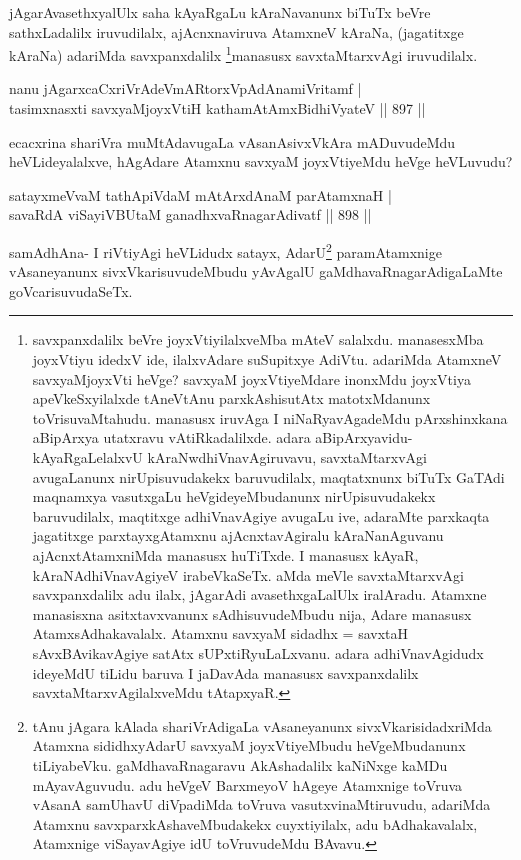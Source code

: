 \begin{artha}
jAgarAvasethxyalUlx saha kAyaRgaLu kAraNavanunx biTuTx beVre sathxLadalilx iruvudilalx, ajAcnxnaviruva AtamxneV kAraNa, (jagatitxge kAraNa) adariMda savxpanxdalilx \footnote{savxpanxdalilx beVre joyxVtiyilalxveMba mAteV salalxdu. manasesxMba joyxVtiyu idedxV ide, ilalxvAdare suSupitxye AdiVtu. adariMda AtamxneV savxyaMjoyxVti heVge? savxyaM joyxVtiyeMdare inonxMdu joyxVtiya apeVkeSxyilalxde tAneVtAnu parxkAshisutAtx matotxMdanunx toVrisuvaMtahudu. manasusx iruvAga I niNaRyavAgadeMdu pArxshinxkana aBipArxya utatxravu vAtiRkadalilxde. adara aBipArxyavidu-kAyaRgaLelalxvU kAraNwdhiVnavAgiruvavu, savxtaMtarxvAgi avugaLanunx nirUpisuvudakekx baruvudilalx, maqtatxnunx biTuTx GaTAdi maqnamxya vasutxgaLu  heVgideyeMbudanunx nirUpisuvudakekx baruvudilalx, maqtitxge adhiVnavAgiye avugaLu ive, adaraMte parxkaqta jagatitxge parxtayxgAtamxnu ajAcnxtavAgiralu kAraNanAguvanu ajAcnxtAtamxniMda manasusx huTiTxde. I manasusx kAyaR, kAraNAdhiVnavAgiyeV irabeVkaSeTx. aMda meVle savxtaMtarxvAgi savxpanxdalilx adu ilalx, jAgarAdi avasethxgaLalUlx iralAradu. Atamxne manasisxna asitxtavxvanunx sAdhisuvudeMbudu nija, Adare manasusx AtamxsAdhakavalalx. Atamxnu savxyaM sidadhx = savxtaH sAvxBAvikavAgiye satAtx sUPxtiRyuLaLxvanu. adara adhiVnavAgidudx ideyeMdU tiLidu baruva I jaDavAda manasusx savxpanxdalilx savxtaMtarxvAgilalxveMdu tAtapxyaR.}manasusx savxtaMtarxvAgi iruvudilalx.
\end{artha}


\begin{shl}
nanu jAgarxcaCxriVrAdeVmARtorxVpAdAnamiVritamf | \\
tasimxnasxti savxyaMjoyxVtiH kathamAtAmx\s BidhiVyateV \hfill||  897 ||  
\end{shl}

\begin{artha}
ecacxrina shariVra muMtAdavugaLa vAsanAsivxVkAra mADuvudeMdu heVLideyalalxve, hAgAdare Atamxnu savxyaM joyxVtiyeMdu heVge heVLuvudu?
\end{artha}

\begin{shl}
satayxmeVvaM tathA\s piVdaM mAtArxdAnaM parAtamxnaH | \\
savaRdA viSayiVBUtaM ganadhxvaRnagarAdivatf \hfill||  898 ||  
\end{shl}

\begin{artha}
samAdhAna- I riVtiyAgi heVLidudx satayx, AdarU\footnote{tAnu jAgara kAlada shariVrAdigaLa vAsaneyanunx sivxVkarisidadxriMda Atamxna sididhxyAdarU savxyaM joyxVtiyeMbudu heVgeMbudanunx tiLiyabeVku. gaMdhavaRnagaravu AkAshadalilx kaNiNxge kaMDu mAyavAguvudu. adu heVgeV BarxmeyoV hAgeye Atamxnige toVruva vAsanA samUhavU diVpadiMda toVruva vasutxvinaMtiruvudu, adariMda Atamxnu savxparxkAshaveMbudakekx cuyxtiyilalx, adu bAdhakavalalx, Atamxnige viSayavAgiye idU toVruvudeMdu BAvavu.} paramAtamxnige vAsaneyanunx sivxVkarisuvudeMbudu yAvAgalU gaMdhavaRnagarAdigaLaMte goVcarisuvudaSeTx.
\end{artha}

